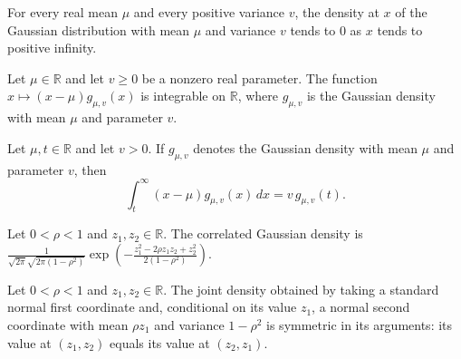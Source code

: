 \begin{theorem}
\label{FABL.tendsto_gaussianPDFReal_posVariance_atTop}
\leanok
{}
For every real mean $\mu$ and every positive variance $v$, the density at $x$ of the
Gaussian distribution with mean $\mu$ and variance $v$ tends to $0$ as $x$ tends to
positive infinity.
\end{theorem}

\begin{theorem}
\label{FABL.integrable_centered_mul_gaussianPDFReal}
\leanok
{}
Let $\mu\in\mathbb{R}$ and let $v\ge 0$ be a nonzero real parameter. The function
$x\mapsto (x-\mu)g_{\mu,v}(x)$ is integrable on $\mathbb{R}$, where $g_{\mu,v}$ is the
Gaussian density with mean $\mu$ and parameter $v$.
\end{theorem}

\begin{theorem}
\label{FABL.integral_Ioi_centered_mul_gaussianPDFReal}
\leanok
{}
Let $\mu,t\in\mathbb{R}$ and let $v>0$. If $g_{\mu,v}$ denotes the Gaussian density with
mean $\mu$ and parameter $v$, then
\[\int_t^\infty (x-\mu)g_{\mu,v}(x)\,dx=v\,g_{\mu,v}(t).\]
\end{theorem}

\begin{theorem}
\label{FABL.correlatedGaussianDensity_formula}
\leanok
{}
Let $0<\rho<1$ and $z_1,z_2\in\mathbb{R}$. The correlated Gaussian density is
$\displaystyle \frac{1}{\sqrt{2\pi}\sqrt{2\pi(1-\rho^2)}}\exp\!\left(-\frac{z_1^2-2\rho
z_1z_2+z_2^2}{2(1-\rho^2)}\right)$.
\end{theorem}

\begin{theorem}
\label{FABL.correlatedGaussianDensity_comm}
\leanok
{}
Let $0<\rho<1$ and $z_1,z_2\in\mathbb{R}$. The joint density obtained by taking a
standard normal first coordinate and, conditional on its value $z_1$, a normal second
coordinate with mean $\rho z_1$ and variance $1-\rho^2$ is symmetric in its arguments:
its value at $(z_1,z_2)$ equals its value at $(z_2,z_1)$.
\end{theorem}

